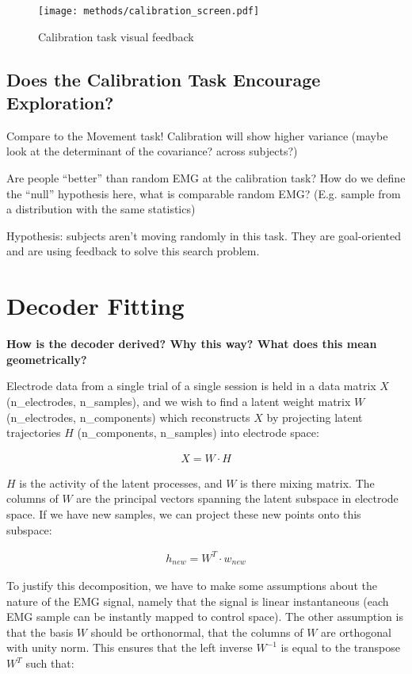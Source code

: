 \documentclass[../main.tex]{subfiles}
\begin{document}
\begin{figure}
  \centering
    \texttt{[image: methods/calibration\_screen.pdf]}
    \caption{Calibration task visual feedback}\label{fig:calibration_task_screen}
  \end{figure}


\subsection{Does the Calibration Task Encourage Exploration?}

Compare to the Movement task! Calibration will show higher variance (maybe look at the determinant of the covariance? across subjects?)

Are people “better” than random EMG at the calibration task? How do we define the “null” hypothesis here, what is comparable random EMG? (E.g. sample from a distribution with the same statistics)

Hypothesis: subjects aren’t moving randomly in this task. They are goal-oriented and are using feedback to solve this search problem.
  
  
 
\section{Decoder Fitting}

\textbf{How is the decoder derived? Why this way? What does this mean geometrically?}


Electrode data from a single trial of a single session is held in a data matrix $X$ (n\_electrodes, n\_samples), and we wish to find a latent weight matrix $W$ (n\_electrodes, n\_components) which reconstructs $X$ by projecting latent trajectories $H$ (n\_components, n\_samples) into electrode space:

\begin{align*}
X = W\cdot{H}
\end{align*}

$H$ is the activity of the latent processes, and $W$ is there mixing matrix. The columns of $W$ are the principal vectors spanning the latent subspace in electrode space. If we have new samples, we can project these new points onto this subspace:

\begin{align*}
h_{new} = W^T\cdot{w_{new}}
\end{align*}

To justify this decomposition, we have to make some assumptions about the nature of the EMG signal, namely that the signal is linear instantaneous (each EMG sample can be instantly mapped to control space). The other assumption is that the basis $W$ should be orthonormal, that the columns of $W$ are orthogonal with unity norm. This ensures that the left inverse $W^{-1}$ is equal to the transpose $W^T$ such that:
\end{document}
